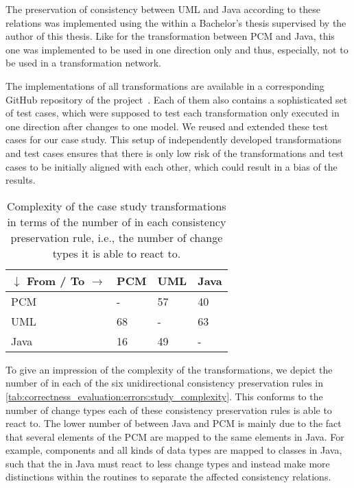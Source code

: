 The preservation of consistency between \gls{UML} and Java according to these relations was implemented using the \reactionslanguage within a Bachelor's thesis supervised by the author of this thesis.
Like for the transformation between \gls{PCM} and Java, this one was implemented to be used in one direction only and thus, especially, not to be used in a transformation network.

The implementations of all transformations are available in a corresponding GitHub repository of the \vitruv project~\cite{vitruvCBSEGithub}.
Each of them also contains a sophisticated set of test cases, which were supposed to test each transformation only executed in one direction after changes to one model.
We reused and extended these test cases for our case study.
This setup of independently developed transformations and test cases ensures that there is only low risk of the transformations and test cases to be initially aligned with each other, which could result in a bias of the results.

\begin{table}
    \centering
    \small
    \renewcommand{\arraystretch}{1.4}
    \begin{tabular}{L{7em}C{4em}C{4em}C{4em}}
        \toprule
        \textbf{$\downarrow$ From} / \textbf{To $\rightarrow$}& \gls{PCM} & \gls{UML} & Java \\
        \midrule
        \gls{PCM} & -   & 57    & 40 \\
        \gls{UML} & 68  & -     & 63 \\
        Java      & 16  & 49    & -  \\
        \bottomrule
    \end{tabular}
    \caption[Complexity of case study transformations]{Complexity of the case study transformations in terms of the number of \reactions in each consistency preservation rule, i.e., the number of change types it is able to react to.}
    \label{tab:correctness_evaluation:errors:study_complexity}
\end{table}

To give an impression of the complexity of the transformations, we depict the number of \reactions in each of the six unidirectional consistency preservation rules in \autoref{tab:correctness_evaluation:errors:study_complexity}.
This conforms to the number of change types each of these consistency preservation rules is able to react to.
The lower number of \reactions between Java and \gls{PCM} is mainly due to the fact that several elements of the \gls{PCM} are mapped to the same elements in Java.
For example, components and all kinds of data types are mapped to classes in Java, such that the \reactions in Java must react to less change types and instead make more distinctions within the routines to separate the affected consistency relations.

